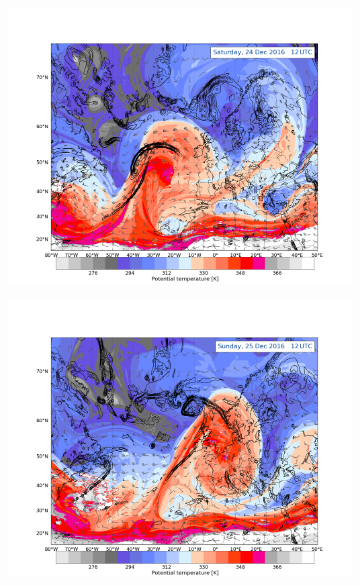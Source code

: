 \begin{figure}\ContinuedFloat
	\centering
	\begin{subfigure}[b]{0.49\textwidth}
		\includegraphics[trim={4.2cm 3.9cm 4.3cm 5.1cm},clip,
		width=\textwidth]{./fig_DynTropo/20161224_12}
		\caption{}\label{fig:DT24}
	\end{subfigure}
	\begin{subfigure}[b]{0.49\textwidth}
		\includegraphics[trim={4.2cm 3.9cm 4.3cm 5.1cm},clip,
		width=\textwidth]{./fig_DynTropo/20161225_12}
		\caption{}\label{fig:DT25}
	\end{subfigure}    

\end{figure}
